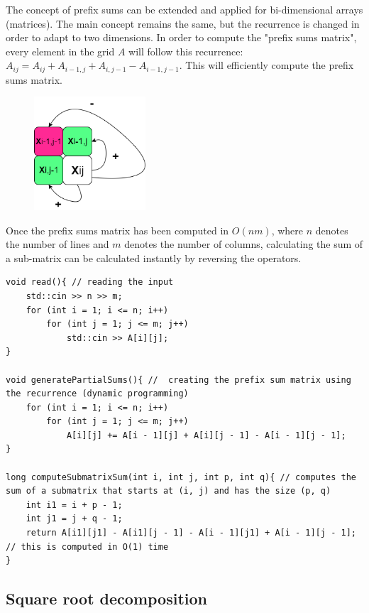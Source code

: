 \documentclass[letterpaper]{article}
\begin{document}
The concept of prefix sums can be extended and applied for bi-dimensional arrays (matrices). The main concept remains the same, but the recurrence is changed in order to adapt to two dimensions. In order to compute the "prefix sums matrix", every element in the grid $A$ will follow this recurrence: $A_{ij} = A_{ij} + A_{i - 1, j} + A_{i, j - 1} - A_{i - 1, j - 1}$. This will efficiently compute the prefix sums matrix.

\newpage

\begin{figure} [h!]
\centering
\includegraphics[width=0.37\textwidth]{pngOfDiagrams/prefixmatrix.png}
\end{figure}

Once the prefix sums matrix has been computed in $O(nm)$, where $n$ denotes the number of lines and $m$ denotes the number of columns, calculating the sum of a sub-matrix can be calculated instantly by reversing the operators.

\begin{lstlisting}
void read(){ // reading the input
    std::cin >> n >> m;
    for (int i = 1; i <= n; i++)
        for (int j = 1; j <= m; j++)
            std::cin >> A[i][j];
}

void generatePartialSums(){ //  creating the prefix sum matrix using the recurrence (dynamic programming)
    for (int i = 1; i <= n; i++)
        for (int j = 1; j <= m; j++)
            A[i][j] += A[i - 1][j] + A[i][j - 1] - A[i - 1][j - 1];
}

long computeSubmatrixSum(int i, int j, int p, int q){ // computes the sum of a submatrix that starts at (i, j) and has the size (p, q)
    int i1 = i + p - 1;
    int j1 = j + q - 1;
    return A[i1][j1] - A[i1][j - 1] - A[i - 1][j1] + A[i - 1][j - 1]; // this is computed in O(1) time
}
\end{lstlisting}

\newpage

\subsection{Square root decomposition}
\end{document}

